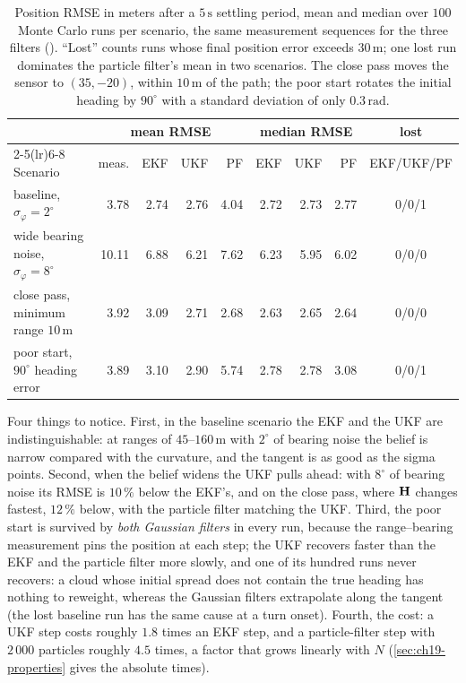 \begin{table}[tb]
  \centering\small
  \caption{Position RMSE in meters after a $5\,\mathrm{s}$ settling period,
  mean and median over $100$ Monte Carlo runs per scenario, the same
  measurement sequences for the three filters
  (). ``Lost'' counts runs whose
  final position error exceeds $30\,\mathrm{m}$; one lost run dominates the
  particle filter's mean in two scenarios. The close pass moves the sensor
  to $(35, -20)$, within $10\,\mathrm{m}$ of the path; the poor start rotates
  the initial heading by $90^\circ$ with a standard deviation of only
  $0.3\,\mathrm{rad}$.}
  \label{tab:ch19-rmse}
  \begin{tabular}{@{}lrrrrrrrc@{}}
  \toprule
  & \multicolumn{4}{c}{mean RMSE} & \multicolumn{3}{c}{median RMSE} & lost\\
  \cmidrule(lr){2-5}\cmidrule(lr){6-8}
  Scenario & meas. & EKF & UKF & PF & EKF & UKF & PF & EKF/UKF/PF\\
  \midrule
  baseline, $\sigma_\varphi = 2^\circ$ & 3.78 & 2.74 & 2.76 & 4.04 & 2.72 & 2.73 & 2.77 & 0/0/1\\
  wide bearing noise, $\sigma_\varphi = 8^\circ$ & 10.11 & 6.88 & 6.21 & 7.62 & 6.23 & 5.95 & 6.02 & 0/0/0\\
  close pass, minimum range $10\,\mathrm{m}$ & 3.92 & 3.09 & 2.71 & 2.68 & 2.63 & 2.65 & 2.64 & 0/0/0\\
  poor start, $90^\circ$ heading error & 3.89 & 3.10 & 2.90 & 5.74 & 2.78 & 2.78 & 3.08 & 0/0/1\\
  \bottomrule
  \end{tabular}
\end{table}

Four things to notice. First, in the baseline scenario the EKF and the UKF
are indistinguishable: at ranges of
$45$--$160\,\mathrm{m}$ with $2^\circ$ of bearing noise the belief is narrow
compared with the curvature, and the tangent is as good as the sigma
points. Second, when the belief widens the UKF pulls ahead: with
$8^\circ$ of bearing noise its RMSE is $10\,\%$ below the EKF's, and on the
close pass, where $\mathbf{H}$ changes fastest, $12\,\%$ below, with the
particle filter matching the UKF. Third, the poor start is survived by
\emph{both Gaussian filters} in every run, because the range--bearing
measurement pins the position at each step; the UKF recovers faster than the
EKF and the particle filter more slowly, and one of its hundred runs never
recovers: a cloud whose
initial spread does not contain the true heading has nothing to reweight,
whereas the Gaussian filters extrapolate along the tangent (the lost
baseline run has the same cause at a turn onset). Fourth, the cost: a UKF
step costs roughly $1.8$ times an EKF step, and a particle-filter step with
$2\,000$ particles roughly $4.5$ times, a factor that grows linearly with $N$
(\cref{sec:ch19-properties} gives the absolute times).

